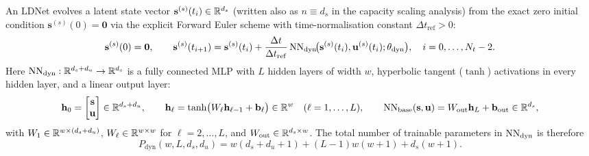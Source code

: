 An LDNet evolves a latent state vector $\mathbf{s}^{(s)}(t_i) \in \mathbb{R}^{d_s}$ (written also as $n \equiv d_s$ in the capacity scaling analysis) from the exact zero initial condition $\mathbf{s}^{(s)}(0) = \mathbf{0}$ via the explicit Forward Euler scheme with time-normalisation constant $\Delta t_{\mathrm{ref}} > 0$:
\begin{equation}
  \mathbf{s}^{(s)}(0) = \mathbf{0}, \qquad
  \mathbf{s}^{(s)}(t_{i+1}) = \mathbf{s}^{(s)}(t_i) + \frac{\Delta t}{\Delta t_{\mathrm{ref}}}\,\mathrm{NN}_{\mathrm{dyn}}\!\big(\mathbf{s}^{(s)}(t_i), \mathbf{u}^{(s)}(t_i); \theta_{\mathrm{dyn}}\big), \quad i = 0, \dots, N_t - 2.
  \label{eq:forward_euler}
\end{equation}
Here $\mathrm{NN}_{\mathrm{dyn}} : \mathbb{R}^{d_s + d_u} \to \mathbb{R}^{d_s}$ is a fully connected MLP with $L$ hidden layers of width $w$, hyperbolic tangent ($\tanh$) activations in every hidden layer, and a linear output layer:
\begin{equation}
  \mathbf{h}_0 = \begin{bmatrix} \mathbf{s} \\ \mathbf{u} \end{bmatrix} \in \mathbb{R}^{d_s + d_u}, \qquad
  \mathbf{h}_\ell = \tanh\!\big(W_\ell \mathbf{h}_{\ell-1} + \mathbf{b}_\ell\big) \in \mathbb{R}^w \quad (\ell = 1,\dots,L), \qquad
  \mathrm{NN}_{\mathrm{base}}(\mathbf{s},\mathbf{u}) = W_{\mathrm{out}}\mathbf{h}_L + \mathbf{b}_{\mathrm{out}} \in \mathbb{R}^{d_s},
  \label{eq:nndyn_mlp}
\end{equation}
with $W_1 \in \mathbb{R}^{w \times (d_s + d_u)}$, $W_\ell \in \mathbb{R}^{w \times w}$ for $\ell=2,\dots,L$, and $W_{\mathrm{out}} \in \mathbb{R}^{d_s \times w}$. The total number of trainable parameters in $\mathrm{NN}_{\mathrm{dyn}}$ is therefore
\begin{equation}
  P_{\mathrm{dyn}}(w, L, d_s, d_u) = w(d_s + d_u + 1) + (L - 1)w(w + 1) + d_s(w + 1).
  \label{eq:P_dyn}
\end{equation}

